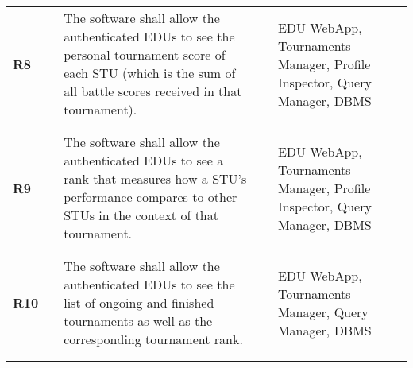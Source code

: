 \begin{longtable}[H]{l l p{6cm} l p{4cm}}
    \textbf{R8}             & \vline & The software shall allow the authenticated EDUs to see the personal tournament score of each STU (which is the sum of all battle scores received in that tournament).                                                                                                        & \vline &  EDU WebApp, Tournaments Manager, Profile Inspector, Query Manager, DBMS                 \\          
                            &        &                                                                                                                                                                                                                                                                              &        &                                                                                          \\\hline & & \\ 
    \textbf{R9}             & \vline & The software shall allow the authenticated EDUs to see a rank that measures how a STU's performance compares to other STUs in the context of that tournament.                                                                                                                & \vline &  EDU WebApp, Tournaments Manager, Profile Inspector, Query Manager, DBMS                 \\          
                            &        &                                                                                                                                                                                                                                                                              &        &                                                                                          \\\hline & & \\ 
    \textbf{R10}            & \vline & The software shall allow the authenticated EDUs to see the list of ongoing and finished tournaments as well as the corresponding tournament rank.                                                                                                                            & \vline &  EDU WebApp, Tournaments Manager, Query Manager, DBMS                                    \\          
                            &        &                                                                                                                                                                                                                                                                              &        &                                                                                          \\\hline & & \\ 

\end{longtable}
